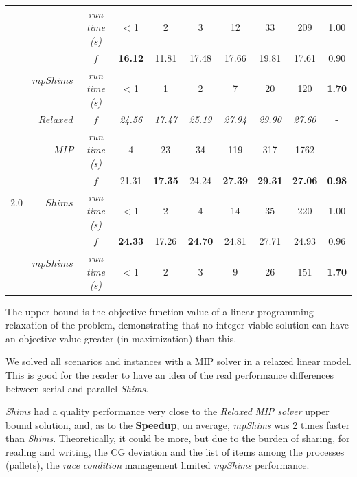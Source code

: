 \documentclass[preprint,authoryear]{elsarticle}
\begin{document}
\begin{table}[H]
\begin{tabular}{crcccccccc}
        &                                 & {\it run time (s)} &     < 1   &     2     &     3     &     12    &     33    &   209     &  1.00 \\%
        \cmidrule{2-10}		                      
        &\multirow{2}{*}{ $mpShims$}      & $f$                &{\bf 16.12}&     11.81 &     17.48 &  17.66    &   19.81   &  17.61    &  0.90 \\%
        &                                 & {\it run time (s)} &     < 1   &     1     &     2     &     7     &   20      &  120      &  {\bf 1.70}\\%
		\toprule
		\multirow{7}{*}{$2.0$}&$Relaxed$  & $f$                &{\it 24.56}&{\it 17.47}&{\it 25.19}&{\it 27.94}&{\it 29.90}&{\it 27.60}& -\\%
		&                       $MIP$     & {\it run time (s)} &     4     &     23    &    34     &   119     &     317      &   1762        & -\\%
		\cmidrule{2-10}		                       
		&\multirow{2}{*}{ $Shims$}        & $f$                &    21.31  &{\bf 17.35}&   24.24   &{\bf 27.39}&{\bf 29.31}&{\bf 27.06}&{\bf 0.98}  \\%
		&                                 & {\it run time (s)} &     < 1   &     2     &     4     &     14    &     35    &   220     &  1.00 \\%
		\cmidrule{2-10}		                       
		&\multirow{2}{*}{ $mpShims$}      & $f$                &{\bf 24.33}&   17.26   &{\bf 24.70}&   24.81   &   27.71   &  24.93    &  0.96  \\%
		&                                 & {\it run time (s)} &     < 1   &     2     &     3     &     9     &   26      &  151      &  {\bf 1.70}\\%
		\bottomrule	
	\end{tabular}
	\normalsize
\end{table}



The upper bound is the objective function value of a linear programming relaxation of the problem, demonstrating that no integer viable solution can have an objective value greater (in maximization) than this.

We solved all scenarios and instances with a MIP solver in a relaxed linear model. This is good for the reader to have an idea of the real performance differences between serial and parallel {\it Shims}.

{\it Shims} had a quality performance very close to the {\it Relaxed MIP solver} upper bound solution, and, as to the {\bf Speedup}, on average, {\it mpShims} was 2 times faster than {\it Shims}. Theoretically, it could be more, but due to the burden of sharing, for reading and writing, the CG deviation and the list of items among the processes (pallets), the {\it race condition} management limited {\it mpShims} performance.
\end{document}
